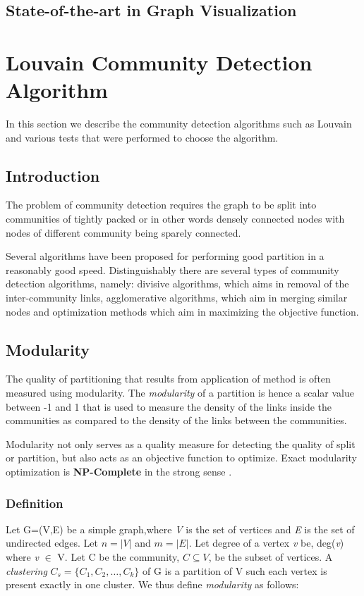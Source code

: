 \section{State-of-the-art in Graph Visualization}

\chapter{Louvain Community Detection Algorithm}
In this section we describe the community detection algorithms such as Louvain and various tests that were performed to choose the algorithm. 
\section{Introduction}

The problem of community detection requires the graph to be split into communities of tightly packed or in other words densely connected nodes with nodes of different community being sparely connected. 

Several algorithms have been proposed for performing good partition in a reasonably good speed.
Distinguishably there are several types of community detection algorithms, namely: divisive algorithms, which aims in removal of the inter-community links, agglomerative algorithms, which aim in merging similar nodes and optimization methods which aim in maximizing the objective function. 
\section{Modularity}
The quality of partitioning that results from application of method is often measured using modularity. The \textit{modularity} of a partition is hence a scalar value between -1 and 1 that is used to measure the density of the links inside the communities as compared to the density of the links between the communities.
\par
Modularity not only serves as a quality measure for detecting the quality of split or partition, but also acts as an objective function to optimize.  Exact modularity optimization is \textbf{NP-Complete} in the strong sense \cite{modularityNP}.
\subsection{Definition}
Let G=(V,E) be a simple graph,where \textit{V} is the set of vertices and \textit{E} is the set of undirected edges. Let $n=|V|$ and $m=|E|$. Let degree of a vertex \textit{v} be, deg(\textit{v}) where \textit{v} $\in$ V. Let C be the community, $C \subseteq V$, be the subset of vertices. A \textit{clustering} $C_s =\{C_1,C_2, \ldots, C_k\}$ of G is a partition of V such each vertex is present exactly in one cluster.  We thus define \textit{modularity } as follows: \cite{modularityNP}

